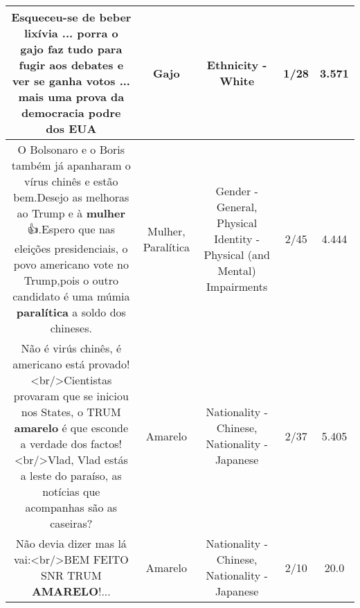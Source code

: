 \documentclass[11pt]{article}
\newlength\mylength
\begin{document}
\begin{center}
\begin{longtable}{|C{.65\mylength}|C{.30\mylength}|C{.12\mylength}|C{.12\mylength}|C{.12\mylength}|}
  \small Esqueceu-se de beber lixívia ... porra o \textbf{gajo} faz tudo para fugir aos debates e ver se ganha votos ... mais uma prova da democracia podre dos EUA\normalsize   & Gajo & Ethnicity - White & 1/28 & 3.571 \\  \hline
  \small O Bolsonaro e o Boris também já apanharam o vírus chinês e estão bem.Desejo as melhoras ao Trump e à \textbf{mulher} 👍.Espero que nas eleições presidenciais, o povo americano vote no Trump,pois o outro candidato é uma múmia \textbf{paralítica} a soldo dos chineses.\normalsize   & Mulher, Paralítica & Gender - General, Physical Identity - Physical (and Mental) Impairments & 2/45 & 4.444 \\  \hline
  \small Não é virús chinês, é americano está provado!<br/>Cientistas provaram que se iniciou nos States, o TRUM \textbf{a\textbf{marelo}} é que esconde a verdade dos factos!<br/>Vlad, Vlad estás a leste do paraíso, as notícias que acompanhas são as caseiras?\normalsize   & Amarelo & Nationality - Chinese, Nationality - Japanese & 2/37 & 5.405 \\  \hline
  \small Não devia dizer mas lá vai:<br/>BEM FEITO SNR TRUM \textbf{A\textbf{MARELO}}!...\normalsize   & Amarelo & Nationality - Chinese, Nationality - Japanese & 2/10 & 20.0 \\  \hline
  
\end{longtable}
\end{center}
\end{document}
